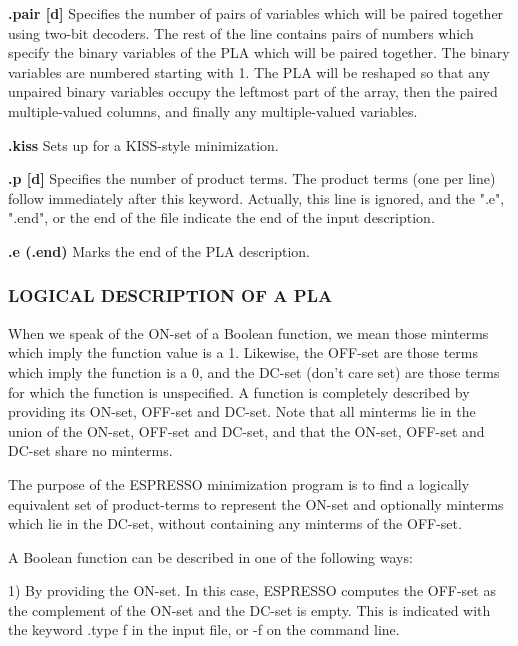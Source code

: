 {\begin{pespace}
    {\bf .pair [d]}   Specifies the number of pairs of variables which
                 will be paired together using two-bit decoders.
                 The rest of the line contains pairs of numbers
                 which specify the binary variables of the PLA
                 which will be paired together.  The binary variables 
are numbered starting with 1.  The PLA
                 will be reshaped so that any unpaired binary
                 variables occupy the leftmost part of the array,
                 then the paired multiple-valued columns, and
                 finally any multiple-valued variables.


    {\bf .kiss     }  Sets up for a KISS-style minimization.

    {\bf .p [d]}      Specifies the number of product terms.  The product 
terms (one per line) follow immediately
                 after this keyword.  Actually, this line is
                 ignored, and the ".e", ".end", or the end of the
                 file indicate the end of the input description.

    {\bf .e (.end)}   Marks the end of the PLA description.



\subsubsection{LOGICAL DESCRIPTION OF A PLA}
     When we speak of the ON-set of a Boolean function, we mean
     those minterms which imply the function value is a 1.  Likewise, 
the OFF-set are those terms which imply the function
     is a 0, and the DC-set (don't care set) are those terms for
     which the function is unspecified.  A function is completely
     described by providing its ON-set, OFF-set and DC-set.  Note
     that all minterms lie in the union of the ON-set, OFF-set
     and DC-set, and that the ON-set, OFF-set and DC-set share no
     minterms.

     The purpose of the ESPRESSO minimization program is to find
     a logically equivalent set of product-terms to represent the
     ON-set and optionally minterms which lie in the DC-set,
     without containing any minterms of the OFF-set.

     A Boolean function can be described in one of the following
     ways:

     1)   By providing the ON-set.  In this case, ESPRESSO computes 
the OFF-set as the complement of the ON-set and
          the DC-set is empty.  This is indicated with the keyword 
.type f in the input file, or -f on the command
          line.


\end{pespace}}

